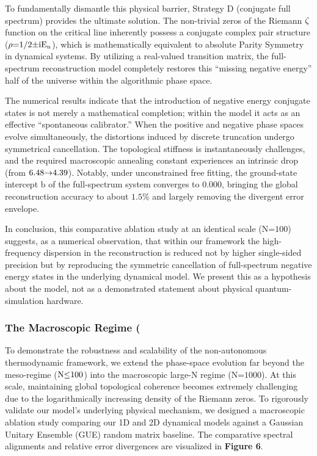 \documentclass[fleqn,10pt]{wlscirep}
\begin{document}
To fundamentally dismantle this physical barrier, Strategy D (conjugate
full spectrum) provides the ultimate solution. The non-trivial zeros of
the Riemann \(\text{\ensuremath{\zeta}}\) function on the critical line inherently
possess a conjugate complex pair structure
(\(\text{\ensuremath{\rho}}\text{=1/2\ensuremath{\pm}}\text{i}\text{E}_{\text{n}}\)), which is
mathematically equivalent to absolute Parity Symmetry in dynamical
systems. By utilizing a real-valued transition matrix, the full-spectrum
reconstruction model completely restores this ``missing negative
energy'' half of the universe within the algorithmic phase space.

The numerical results indicate that the introduction
of negative energy conjugate states is not merely a mathematical
completion; within the model it acts as an effective ``spontaneous calibrator.''
When the positive and negative phase spaces evolve simultaneously, the
distortions induced by discrete truncation undergo symmetrical
cancellation. The topological stiffness is instantaneously challenges,
and the required macroscopic annealing constant experiences an intrinsic
drop (from \(\text{6.48\ensuremath{\rightarrow}4.39}\)). Notably, under
unconstrained free fitting, the ground-state intercept \(\text{b}\) of
the full-spectrum system converges to
\(\text{0.000}\), bringing the global reconstruction accuracy to about
\(\text{1.5\%}\) and largely removing the divergent error envelope.

In conclusion, this comparative ablation study at an identical scale
(\(\text{N}\text{=100}\)) suggests, as a numerical observation, that within
our framework the high-frequency dispersion in the reconstruction is
reduced not by higher single-sided precision but by reproducing the
symmetric cancellation of full-spectrum negative energy states in the
underlying dynamical model. We present this as a hypothesis about the
model, not as a demonstrated statement about physical quantum-simulation
hardware.

\subsubsection*{The Macroscopic Regime (}

To demonstrate the robustness and scalability of the non-autonomous
thermodynamic framework, we extend the phase-space evolution far beyond
the meso-regime (\(\text{N}\text{\ensuremath{\le}100}\)) into the macroscopic
large-N regime (\(\text{N}\text{=1000}\)). At this scale,
maintaining global topological coherence becomes extremely challenging
due to the logarithmically increasing density of the Riemann zeros. To
rigorously validate our model's underlying physical mechanism, we
designed a macroscopic ablation study comparing our 1D and 2D dynamical
models against a Gaussian Unitary Ensemble (GUE) random matrix baseline.
The comparative spectral alignments and relative error divergences are
visualized in \textbf{Figure 6}.
\end{document}
